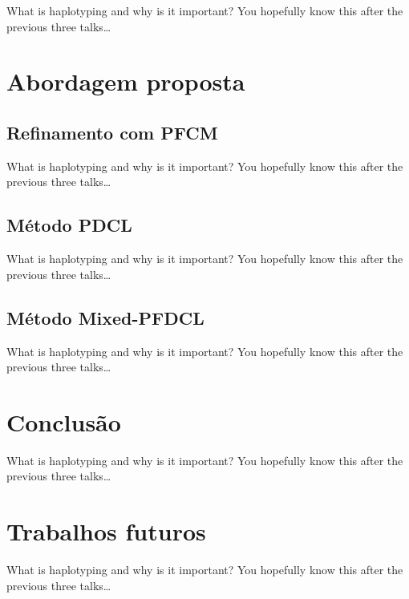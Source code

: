 \documentclass{beamer}
\begin{document}
\begin{frame}{What is haplotyping and why is it important?}
  You hopefully know this after the previous three talks\dots
\end{frame}

\section{Abordagem proposta}

\subsection{Refinamento com PFCM}
\begin{frame}{What is haplotyping and why is it important?}
  You hopefully know this after the previous three talks\dots
\end{frame}
\subsection{Método PDCL}
\begin{frame}{What is haplotyping and why is it important?}
  You hopefully know this after the previous three talks\dots
\end{frame}
\subsection{Método Mixed-PFDCL}
\begin{frame}{What is haplotyping and why is it important?}
  You hopefully know this after the previous three talks\dots
\end{frame}

\section{Conclusão}

\begin{frame}{What is haplotyping and why is it important?}
  You hopefully know this after the previous three talks\dots
\end{frame}

\section{Trabalhos futuros}

\begin{frame}{What is haplotyping and why is it important?}
  You hopefully know this after the previous three talks\dots
\end{frame}
\end{document}
